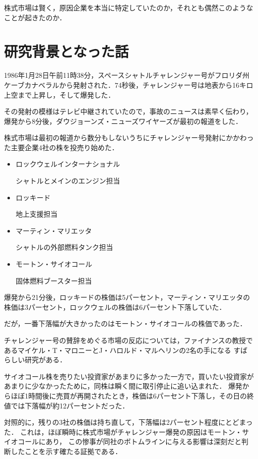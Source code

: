 株式市場は賢く，原因企業を本当に特定していたのか，それとも偶然このようなことが起きたのか．



\section{研究背景となった話}


1986年1月28日午前11時38分，スペースシャトルチャレンジャー号がフロリダ州ケーブカナベラルから発射された．74秒後，チャレンジャー号は地表から16キロ上空まで上昇し，そして爆発した．

その発射の模様はテレビ中継されていたので，事故のニュースは素早く伝わり，爆発から8分後，ダウジョーンズ・ニューズワイヤーズが最初の報道をした．

株式市場は最初の報道から数分もしないうちにチャレンジャー号発射にかかわった主要企業4社の株を投売り始めた．

\begin{itemize}
  \item ロックウェルインターナショナル

シャトルとメインのエンジン担当
  \item ロッキード

地上支援担当
  \item マーティン・マリエッタ

シャトルの外部燃料タンク担当
  \item モートン・サイオコール  

固体燃料ブースター担当
\end{itemize}


爆発から21分後，ロッキードの株価は5パーセント，マーティン・マリエッタの株価は3パーセント，ロックウェルの株価は6パーセント下落していた．

だが，一番下落幅が大きかったのはモートン・サイオコールの株価であった．

チャレンジャー号の賛辞をめぐる市場の反応については，ファイナンスの教授であるマイケル・T・マロニーとJ・ハロルド・マルヘリンの2名の手になる
すばらしい研究がある．

サイオコール株を売りたい投資家があまりに多かった一方で，買いたい投資家があまりに少なかったために，同株は瞬く間に取引停止に追い込まれた．
爆発からほぼ1時間後に売買が再開されたとき，株価は6パーセント下落し，その日の終値では下落幅が約12パーセントだった．

対照的に，残りの3社の株価は持ち直して，下落幅は2パーセント程度にとどまった．
これは，ほぼ瞬時に株式市場がチャレンジャー爆発の原因はモートン・サイオコールにあり，
この惨事が同社のボトムラインに与える影響は深刻だと判断したことを示す確たる証拠である．

